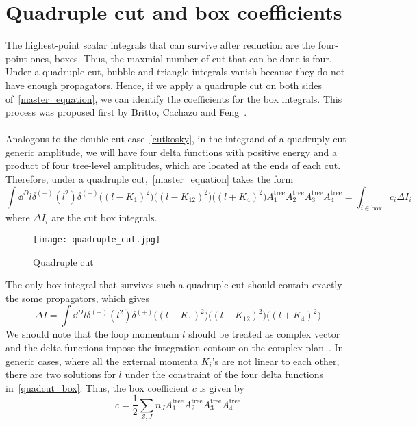 \section{Quadruple cut and box coefficients}\label{sect-quadcut}
The highest-point scalar integrals that can survive after reduction are the four-point ones, \ie boxes. 
Thus, the maxmial number of cut that can be done is four. 
Under a quadruple cut, bubble and triangle integrals vanish because they do not have enough propagators.
Hence, if we apply a quadruple cut on both sides of~\cref{master_equation}, we can identify the coefficients for the box integrals.
This process was proposed first by Britto, Cachazo and Feng~\cite{Britto:2004nc}.
\\\\
Analogous to the double cut case~\cref{cutkosky}, in the integrand of a quadruply cut generic amplitude, we will have four delta functions with positive energy and a product of four tree-level amplitudes, which are located at the ends of each cut. 
Therefore, under a quadruple cut,~\cref{master_equation} takes the form
\begin{equation*}
\int\dd^D l \delta^{(+)}(l^2) \delta^{(+)}\big((l-K_1)^2\big)\big((l-K_{12})^2\big)\big((l+K_4)^2\big)
A_1^{\mathrm{tree}}A_2^{\mathrm{tree}}A_3^{\mathrm{tree}}A_4^{\mathrm{tree}}=
\int_{i\in\mathrm{box}} c_i \Delta I_i
\end{equation*}
where $\Delta I_i$ are the cut box integrals.
\begin{figure}[h]
  \centering
  \texttt{[image: quadruple\_cut.jpg]}
  \caption{Quadruple cut}
  \label{fig-quadruple_cut}
\end{figure}
The only box integral that survives such a quadruple cut should contain exactly the some propagators, which gives
\begin{equation}\label{quadcut_box}
\Delta I = \int \dd^D l \delta^{(+)}(l^2) \delta^{(+)}\big((l-K_1)^2\big)\big((l-K_{12})^2\big)\big((l+K_4)^2\big)
\end{equation}
We should note that the loop momentum $l$ should be treated as complex vector and the delta functions impose the integration contour on the complex plan~\cite{PhysRevD.75.025028, Kosower:2011ty}.
In generic cases, where all the external momenta $K_i$'s are not linear to each other, 
there are two solutions for $l$ under the constraint of the four delta functions in~\cref{quadcut_box}. 
Thus, the box coefficient $c$ is given by
\begin{equation}\label{box_coeff}
c = \frac{1}{2}\sum_{\mathcal{S}, J}n_J A_1^{\mathrm{tree}}A_2^{\mathrm{tree}}A_3^{\mathrm{tree}}A_4^{\mathrm{tree}}
\end{equation}
